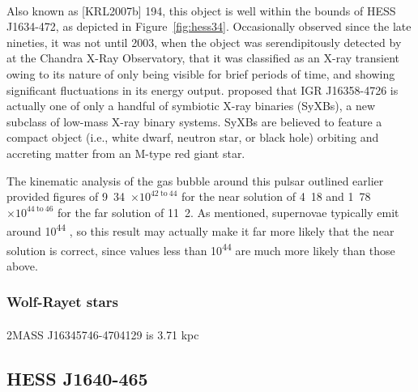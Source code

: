 \documentclass[a4paper, titlepage, oneside]{article}
\newcommand{\e}[1]{\ensuremath{\times 10^{#1}}}
\newcommand{\parsec}{\mathrm{pc}}
\begin{document}
\begin{multicols}{2}
\paragraph{}
Also known as [KRL2007b] 194, this object is well within the bounds of HESS J1634-472, as depicted in Figure~\ref{fig:hess34}. Occasionally observed since the late nineties, it was not until 2003, when the object was serendipitously detected by \textcite{Patel:2004} at the Chandra X-Ray Observatory, that it was classified as an X-ray transient owing to its nature of only being visible for brief periods of time, and showing significant fluctuations in its energy output. \textcite{Nespoli:2010} proposed that IGR J16358-4726 is actually one of only a handful of symbiotic X-ray binaries (SyXBs), a new subclass of low-mass X-ray binary systems. SyXBs are believed to feature a compact object (i.e., white dwarf, neutron star, or black hole) orbiting and accreting matter from an M-type red giant star.

The kinematic analysis of the gas bubble around this pulsar outlined earlier provided figures of \unit{9.34\e{42 \mathrm{~to~} 44}}{\joule} for the near solution of \unit{4.18}{\kilo\parsec} and \unit{1.78\e{44 \mathrm{~to~} 46}}{\joule} for the far solution of \unit{11.2}{\kilo\parsec}. As mentioned, supernovae typically emit around \unit{10^{44}}{\joule} \parencite{Khokhlov:1993}, so this result may actually make it far more likely that the near solution is correct, since values less than \unit{10^{44}} are much more likely than those above.

\subsubsection{Wolf-Rayet stars}
\paragraph{}
2MASS J16345746-4704129 is 3.71 kpc

\subsection{HESS J1640-465}


\end{multicols}
\end{document}
